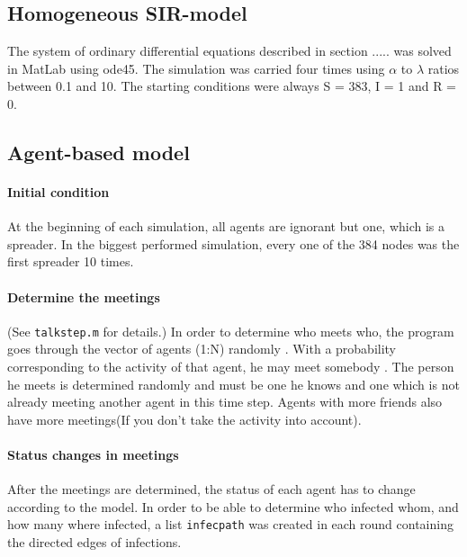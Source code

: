 \subsection{Homogeneous SIR-model}

The system of ordinary differential equations described in section ..... was solved in MatLab using ode45. The simulation was carried four times using $\alpha$ to $\lambda$ ratios between 0.1 and 10. The starting conditions were always S = 383, I = 1 and R = 0.

\subsection{Agent-based model}

\paragraph{Initial condition}

At the beginning of each simulation, all agents are ignorant but one, which is a spreader. In the biggest performed simulation, every one of the 384 nodes was the first spreader 10 times. 

\paragraph{Determine the meetings}

(See \texttt{talkstep.m} for details.)
\newline
\newline
In order to determine who meets who, the program goes through the vector of agents (1:N) randomly . With a probability corresponding to the activity of that agent, he may meet somebody . The person he meets is determined randomly and must be one he knows and one which is not already meeting another agent in this time step. Agents with more friends also have more meetings(If you don't take the activity into account). 

\paragraph{Status changes in meetings}

After the meetings are determined, the status of each agent has to change according to the model. In order to be able to determine who infected whom, and how many where infected, a list \texttt{infecpath} was created in each round containing the directed edges of infections.




